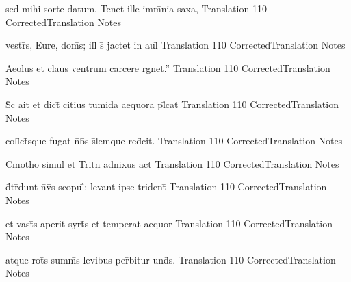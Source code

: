 \documentclass[]{book}
\begin{document}
\newpage

\latline
  {sed mihi sorte datum.  Tenet ille imm\={}nia saxa,}
  { Translation }
  {110}
  { CorrectedTranslation }
  { Notes }


\latline
  {vestr\={}s, Eure, dom\={}s; ill\={} s\={} jactet in aul\={}}
  { Translation }
  {110}
  { CorrectedTranslation }
  { Notes }


\latline
  {Aeolus et claus\={} vent\={}rum carcere r\={}gnet.''}
  { Translation }
  {110}
  { CorrectedTranslation }
  { Notes }



\newpage

\latline
  {S\={\macron {\i}}c ait et dict\={} citius tumida aequora pl\={}cat}
  { Translation }
  {110}
  { CorrectedTranslation }
  { Notes }


\latline
  {coll\={}ct\={}sque fugat n\={}b\={}s s\={}lemque red\={}cit.}
  { Translation }
  {110}
  { CorrectedTranslation }
  { Notes }


\latline
  {C\={}motho\={} simul et Trit\={}n adnixus ac\={}t\={}}
  { Translation }
  {110}
  { CorrectedTranslation }
  { Notes }



\newpage

\latline
  {d\={}tr\={}dunt n\={}v\={\macron {\i}}s scopul\={}; levant ipse trident\={\macron {\i}}}
  { Translation }
  {110}
  { CorrectedTranslation }
  { Notes }


\latline
  {et vast\={}s aperit syrt\={\macron {\i}}s et temperat aequor}
  { Translation }
  {110}
  { CorrectedTranslation }
  { Notes }


\latline
  {atque rot\={\macron {\i}}s summ\={}s levibus per\={}bitur und\={}s.}
  { Translation }
  {110}
  { CorrectedTranslation }
  { Notes }



\newpage
\end{document}
